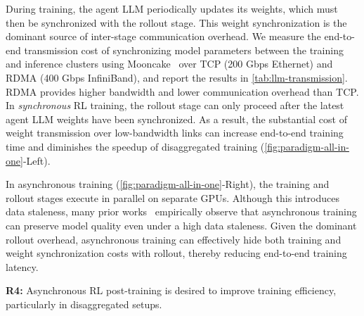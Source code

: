 During training, the agent LLM periodically updates its weights, which must then be synchronized with the rollout stage. This weight synchronization is the dominant source of inter-stage communication overhead. We measure the end-to-end transmission cost of synchronizing model parameters between the training and inference clusters using Mooncake~\cite{qin2024mooncake} over TCP (200 Gbps Ethernet) and RDMA (400 Gbps InfiniBand), and report the results in \autoref{tab:llm-transmission}. RDMA provides higher bandwidth and lower communication overhead than TCP. In \emph{synchronous} RL training, the rollout stage can only proceed after the latest agent LLM weights have been synchronized. As a result, the substantial cost of weight transmission over low-bandwidth links can increase end-to-end training time and diminishes the speedup of disaggregated training (\autoref{fig:paradigm-all-in-one}-Left).

In asynchronous training (\autoref{fig:paradigm-all-in-one}-Right),  the training and rollout stages execute in parallel on separate GPUs. Although this introduces data staleness, many prior works~\cite{rollflash,areal,RhymeRL} empirically observe that asynchronous training can preserve model quality even under a high data staleness. Given the dominant rollout overhead, asynchronous training can effectively hide both training and weight synchronization costs with rollout, thereby reducing end-to-end training latency.


\begin{tcolorbox}[colback=blue!5!white,colframe=gray!75!black,left=1mm, right=1mm, top=0.5mm, bottom=0.5mm, arc=1mm]
\textbf{R4:} Asynchronous RL post-training is desired to improve training efficiency, particularly in disaggregated setups.
\end{tcolorbox}

